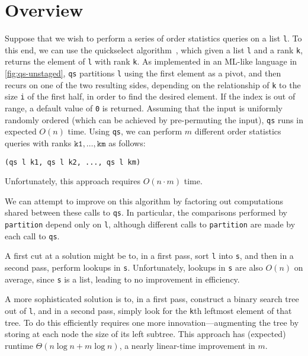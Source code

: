 
\section{Overview}
\label{sec:overview}

\begin{abstrsyn}



Suppose that we wish to perform a series of order statistics queries
on a list \texttt{l}. To this end, we can use the quickselect
algorithm~\cite{Hoare:1961}, which given a list \texttt{l} and a rank
\texttt{k}, returns the element of \texttt{l} with rank \texttt{k}.
As implemented in an ML-like language in \ref{fig:qs-unstaged},
\texttt{qs} partitions \texttt{l} using the first element as
a pivot, and then recurs on one of the two resulting sides, depending on
the relationship of \texttt{k} to the size \texttt{i} of the first half, in
order to find the desired element.  
If the index is out of range, a default value of \texttt{0} is returned.
Assuming that the input is uniformly
randomly ordered (which can be achieved by pre-permuting the input), \texttt{qs}
runs in expected $O(n)$ time.
%
Using \texttt{qs}, we can perform $m$ different order statistics queries with
ranks $\mathtt{k1},\dots,\mathtt{km}$ as follows:
%
\begin{lstlisting}
(qs l k1, qs l k2, ..., qs l km)
\end{lstlisting}
%
Unfortunately, this approach requires $O(n \cdot m)$ time.

We can attempt to improve on this algorithm by factoring out computations shared
between these calls to \texttt{qs}. In particular, the comparisons performed by
\texttt{partition} depend only on \texttt{l}, although different calls to
\texttt{partition} are made by each call to \texttt{qs}.

A first cut at a solution might be to, in a first pass, sort \texttt{l} into
\texttt{s}, and then in a second pass, perform lookups in \texttt{s}.
Unfortunately, lookups in \texttt{s} are also $O(n)$ on average, since
\texttt{s} is a list, leading to no improvement in efficiency.  

A more sophisticated solution is to, in a first pass, construct a binary search
tree out of \texttt{l}, and in a second pass, simply look for the \texttt{k}th
leftmost element of that tree. To do this efficiently requires one more
innovation---augmenting the tree by storing at each node the size of its left
subtree. This approach has (expected) runtime $\Theta(n\log{n} + m\log{n})$, a
nearly linear-time improvement in $m$.


\end{abstrsyn}
